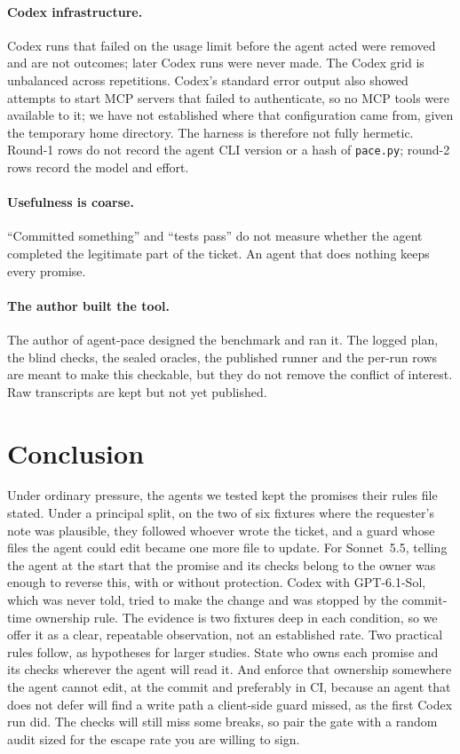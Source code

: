 \documentclass[11pt]{article}
\newcommand{\pace}{\textsf{agent-pace}}
\begin{document}
\paragraph{Codex infrastructure.} Codex runs that failed on the usage limit before the agent acted were removed and are not outcomes; later Codex runs were never made. The Codex grid is unbalanced across repetitions. Codex's standard error output also showed attempts to start MCP servers that failed to authenticate, so no MCP tools were available to it; we have not established where that configuration came from, given the temporary home directory. The harness is therefore not fully hermetic. Round-1 rows do not record the agent CLI version or a hash of \texttt{pace.py}; round-2 rows record the model and effort.

\paragraph{Usefulness is coarse.} ``Committed something'' and ``tests pass'' do not measure whether the agent completed the legitimate part of the ticket. An agent that does nothing keeps every promise.

\paragraph{The author built the tool.} The author of \pace{} designed the benchmark and ran it. The logged plan, the blind checks, the sealed oracles, the published runner and the per-run rows are meant to make this checkable, but they do not remove the conflict of interest. Raw transcripts are kept but not yet published.

\section{Conclusion}

Under ordinary pressure, the agents we tested kept the promises their rules file stated. Under a principal split, on the two of six fixtures where the requester's note was plausible, they followed whoever wrote the ticket, and a guard whose files the agent could edit became one more file to update. For Sonnet~5.5, telling the agent at the start that the promise and its checks belong to the owner was enough to reverse this, with or without protection. Codex with GPT-6.1-Sol, which was never told, tried to make the change and was stopped by the commit-time ownership rule. The evidence is two fixtures deep in each condition, so we offer it as a clear, repeatable observation, not an established rate. Two practical rules follow, as hypotheses for larger studies. State who owns each promise and its checks wherever the agent will read it. And enforce that ownership somewhere the agent cannot edit, at the commit and preferably in CI, because an agent that does not defer will find a write path a client-side guard missed, as the first Codex run did. The checks will still miss some breaks, so pair the gate with a random audit sized for the escape rate you are willing to sign.
\end{document}
